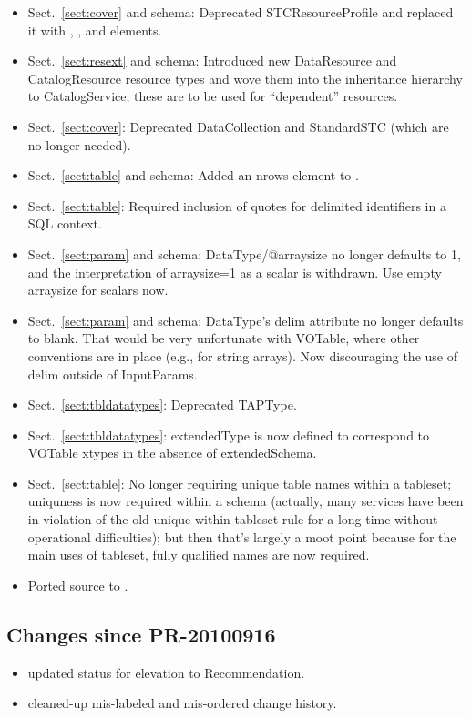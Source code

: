 \documentclass[11pt,a4paper]{ivoa}
\begin{document}
\begin{itemize}
\item Sect.~\ref{sect:cover} and schema: Deprecated STCResourceProfile and replaced it with
, , and  elements.
\item Sect.~\ref{sect:resext} and schema:
Introduced new DataResource and CatalogResource resource types
and wove them into the inheritance hierarchy to CatalogService; these
are to be used for ``dependent'' resources.
\item Sect.~\ref{sect:cover}:
Deprecated DataCollection and StandardSTC (which are no longer
needed).
\item Sect.~\ref{sect:table}
and schema: Added an nrows element to .
\item Sect.~\ref{sect:table}:
Required inclusion of quotes for delimited identifiers in a
SQL context.
\item Sect.~\ref{sect:param} and schema:
DataType/@arraysize no longer defaults to 1, and the
interpretation of arraysize=1 as a scalar is withdrawn.  Use empty
arraysize for scalars now.
\item Sect.~\ref{sect:param} and schema:
DataType's delim attribute no longer defaults to blank.  That
would be very unfortunate with VOTable, where other conventions are in
place (e.g., for string arrays).  Now discouraging the use of delim
outside of InputParams.
\item Sect.~\ref{sect:tbldatatypes}: Deprecated TAPType.
\item Sect.~\ref{sect:tbldatatypes}:
extendedType is now defined to correspond to VOTable xtypes in the
absence of extendedSchema.
\item Sect.~\ref{sect:table}:
No longer requiring unique table names within a tableset;
uniquness is now required within a schema (actually, many services have
been in violation of the old unique-within-tableset rule for a long time
without operational difficulties); but then that's largely a moot point
because for the main uses of tableset, fully qualified names are now
required.
\item Ported source to \ivoatex.
\end{itemize}

\subsection{Changes since PR-20100916}

\begin{itemize}
  \item updated status for elevation to Recommendation.
  \item cleaned-up mis-labeled and mis-ordered change history.
\end{itemize}
\end{document}
